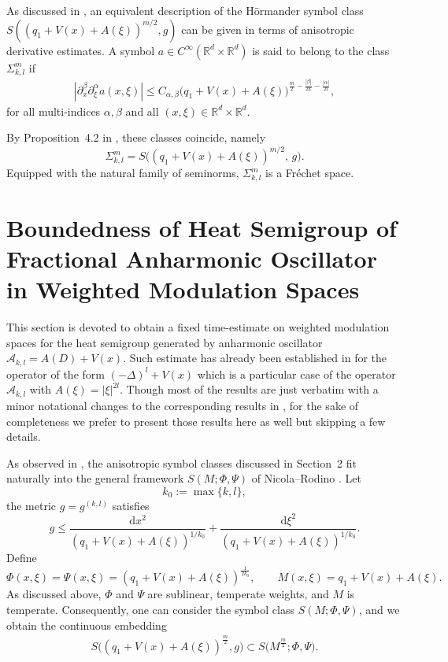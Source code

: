 \documentclass[12pt,reqno,a4paper]{amsart}
\numberwithin{equation}{section}
\theoremstyle{plain}
\theoremstyle{definition}
\theoremstyle{remark}
\def \Ad{\mathcal{A}_{k,l}}
\begin{document}
As discussed in \cite{MR4489248}, an equivalent description of the Hörmander symbol class
$S((q_{1}+V(x)+A(\xi))^{m/2},g)$ can be given in terms of anisotropic derivative estimates.
A symbol $a\in C^\infty(\mathbb R^d\times\mathbb R^d)$ is said to belong to the class
$\Sigma^m_{k,l}$ if
\begin{align}
\label{symbolclassdef}
|\partial_x^\beta \partial_\xi^\alpha a(x,\xi)|
\le C_{\alpha,\beta}
\bigl(q_{1}+V(x)+A(\xi)\bigr)^{\frac{m}{2}-\frac{|\beta|}{2k}-\frac{|\alpha|}{2l}},
\end{align}
for all multi-indices $\alpha,\beta$ and all $(x,\xi)\in\mathbb R^d\times\mathbb R^d$.

By Proposition~4.2 in \cite{MR4489248}, these classes coincide, namely
\[
\Sigma^m_{k,l}
= S\bigl((q_{1}+V(x)+A(\xi))^{m/2},\,g\bigr).
\]
Equipped with the natural family of seminorms, $\Sigma^m_{k,l}$ is a Fréchet space.


\section{Boundedness of Heat Semigroup  of Fractional Anharmonic Oscillator in Weighted Modulation Spaces}
This section is devoted to obtain a fixed time-estimate on weighted modulation spaces for the heat semigroup generated by anharmonic oscillator $\Ad=A(D)+V(x)$. Such estimate has already been established in \cite{dasgupta2026phase} for the operator of the form $(-\Delta)^{l}+V(x)$ which is a particular case of the operator $\Ad$ with $A(\xi)=|\xi|^{2l}$. Though most of the results are just  verbatim with a minor notational changes to the corresponding results in \cite{dasgupta2026phase}, for the sake of completeness we prefer to present those results here as well but skipping a few details. 


As observed in \cite{MR4299820}, the anisotropic symbol classes discussed in Section~2 fit naturally into the general framework $S(M;\Phi,\Psi)$ of Nicola--Rodino \cite{MR2668420}.
Let
\[
k_0 := \max\{k,l\},
\]
the metric $g=g^{(k,l)}$ satisfies
\[
g
\le
\frac{\mathrm{d}x^{2}}{(q_{1}+V(x)+A(\xi))^{1/k_0}}
+
\frac{\mathrm{d}\xi^{2}}{(q_{1}+V(x)+A(\xi))^{1/k_0}}.
\]
Define
\[
\Phi(x,\xi)=\Psi(x,\xi)=(q_{1}+V(x)+A(\xi))^{\frac{1}{2k_0}},
\qquad
M(x,\xi)=q_{1}+V(x)+A(\xi).
\]
As discussed above, $\Phi$ and $\Psi$ are sublinear, temperate weights, and $M$ is temperate. Consequently, one can consider the symbol class $S(M;\Phi,\Psi)$, and we obtain the continuous embedding
\begin{align}
\label{Symbolinclusion}
S\bigl((q_{1}+V(x)+A(\xi))^{\frac{m}{2}},g\bigr)
\subset
S\bigl(M^{\frac{m}{2}};\Phi,\Psi\bigr).
\end{align}
\end{document}
